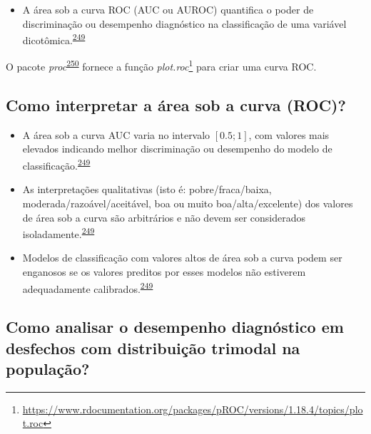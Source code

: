 \documentclass[
  a4paper,
]{book}
\providecommand{\tightlist}{%
  \setlength{\itemsep}{0pt}\setlength{\parskip}{0pt}}
\renewcommand{\href}[2]{#2\footnote{\url{#1}}}
\newenvironment{infobox}[1]
  {
  \begin{itemize}
  \renewcommand{\labelitemi}{
    \raisebox{-.7\height}[0pt][0pt]{
      {\setkeys{Gin}{width=3em,keepaspectratio}
        \texttt{[image: \#1]}}
    }
  }
  \setlength{\fboxsep}{1em}
  \begin{blackbox}
  \item
  }
  {
  \end{blackbox}
  \end{itemize}
  }
\begin{document}
\begin{itemize}
\tightlist
\item
  A área sob a curva ROC (AUC ou AUROC) quantifica o poder de discriminação ou desempenho diagnóstico na classificação de uma variável dicotômica.\textsuperscript{\protect\hyperlink{ref-de2022}{249}}
\end{itemize}

\begin{infobox}{images/Rlogo}
O pacote \emph{proc}\textsuperscript{\protect\hyperlink{ref-pROC}{250}} fornece a função \href{https://www.rdocumentation.org/packages/pROC/versions/1.18.4/topics/plot.roc}{\emph{plot.roc}} para criar uma curva ROC.

\end{infobox}

\hypertarget{como-interpretar-a-uxe1rea-sob-a-curva-roc}{%
\subsection{Como interpretar a área sob a curva (ROC)?}\label{como-interpretar-a-uxe1rea-sob-a-curva-roc}}

\begin{itemize}
\item
  A área sob a curva AUC varia no intervalo \([0.5; 1]\), com valores mais elevados indicando melhor discriminação ou desempenho do modelo de classificação.\textsuperscript{\protect\hyperlink{ref-de2022}{249}}
\item
  As interpretações qualitativas (isto é: pobre/fraca/baixa, moderada/razoável/aceitável, boa ou muito boa/alta/excelente) dos valores de área sob a curva são arbitrários e não devem ser considerados isoladamente.\textsuperscript{\protect\hyperlink{ref-de2022}{249}}
\item
  Modelos de classificação com valores altos de área sob a curva podem ser enganosos se os valores preditos por esses modelos não estiverem adequadamente calibrados.\textsuperscript{\protect\hyperlink{ref-de2022}{249}}
\end{itemize}

\hypertarget{como-analisar-o-desempenho-diagnuxf3stico-em-desfechos-com-distribuiuxe7uxe3o-trimodal-na-populauxe7uxe3o}{%
\subsection{Como analisar o desempenho diagnóstico em desfechos com distribuição trimodal na população?}\label{como-analisar-o-desempenho-diagnuxf3stico-em-desfechos-com-distribuiuxe7uxe3o-trimodal-na-populauxe7uxe3o}}
\end{document}
